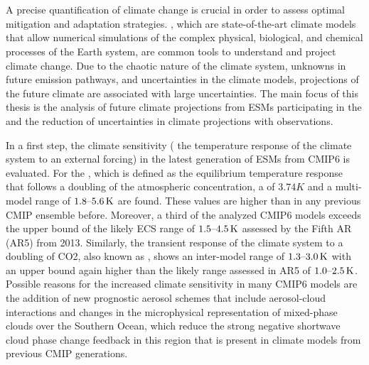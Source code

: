 
%



\chapter{\abstractname}

A precise quantification of climate change is crucial in order to assess
optimal mitigation and adaptation strategies. , which are
state-of-the-art climate models that allow numerical simulations of the complex
physical, biological, and chemical processes of the Earth system, are common
tools to understand and project climate change. Due to the chaotic nature of
the climate system, unknowns in future emission pathways, and uncertainties in
the climate models, projections of the future climate are associated with large
uncertainties. The main focus of this thesis is the analysis of future climate
projections from \acsp{ESM} participating in the  and the
reduction of uncertainties in climate projections with observations.

In a first step, the climate sensitivity (\ie{} the temperature response of the
climate system to an external forcing) in the latest generation of \acsp{ESM}
from \acs{CMIP}6 is evaluated. For the , which is defined as
the equilibrium temperature response that follows a doubling of the atmospheric
 concentration, a  of $3.74 \unit{K}$ and a
multi-model range of $\rangeunit{1.8}{5.6}{K}$ are found. These values are
higher than in any previous \acs{CMIP} ensemble before. Moreover, a third of
the analyzed \acs{CMIP}6 models exceeds the upper bound of the likely \acs{ECS}
range of $\rangeunit{1.5}{4.5}{K}$ assessed by the  Fifth
\acl{AR} (\acs{AR}5) from 2013. Similarly, the transient response of the
climate system to a doubling of \acs{CO2}, also known as ,
shows an inter-model range of $\rangeunit{1.3}{3.0}{K}$ with an upper bound
again higher than the likely range assessed in \acs{AR}5 of
$\rangeunit{1.0}{2.5}{K}$. Possible reasons for the increased climate
sensitivity in many \acs{CMIP}6 models are the addition of new prognostic
aerosol schemes that include aerosol-cloud interactions and changes in the
microphysical representation of mixed-phase clouds over the Southern Ocean,
which reduce the strong negative shortwave cloud phase change feedback in this
region that is present in climate models from previous \acs{CMIP} generations.

